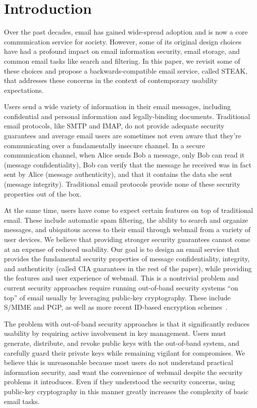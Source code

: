 \section{Introduction}

Over the past decades, email has gained wide-spread adoption 
and is now a core communication service for society. However, 
some of its original design choices have had a profound impact 
on email information security, email storage, and common email 
tasks like search and filtering. In this paper, we revisit some 
of these choices and propose a backwards-compatible email service, 
called STEAK, that addresses these concerns in the context of 
contemporary usability expectations.

Users send a wide variety of information in their email messages, 
including confidential and personal information and legally-binding 
documents. Traditional email protocols, like SMTP and IMAP, do not 
provide adequate security guarantees and average email users are 
sometimes not even aware that they're communicating over a fundamentally 
insecure channel. In a secure communication channel, when Alice sends 
Bob a message, only Bob can read it (message confidentiality), Bob can 
verify that the message he received was in fact sent by Alice (message 
authenticity), and that it contains the data she sent (message integrity). 
Traditional email protocols provide none of these security properties 
out of the box. 

At the same time, users have come to expect certain features on top of 
traditional email.  These include automatic spam filtering, the ability 
to search and organize messages, and ubiquitous access to their email 
through webmail from a variety of user devices. We believe that providing 
stronger security guarantees cannot come at an expense of reduced usability. 
Our goal is to design an email service that provides the fundamental 
security properties of message confidentiality, integrity, and authenticity 
(called CIA guarantees in the rest of the paper), while providing the 
features and user experience of webmail.  This is a nontrivial problem 
and current security approaches require running out-of-band security 
systems ``on top'' of email usually by leveraging public-key cryptography. 
These include S/MIME and PGP, as well as more recent ID-based encryption 
schemes~\cite{id-based-cryptography}.

The problem with out-of-band security approaches is that it significantly 
reduces usability by requiring active involvement in key management. 
Users must generate, distribute, and revoke public keys with the out-of-band 
system, and carefully guard their private keys while remaining vigilant 
for compromises. We believe this is unreasonable because most users do 
not understand practical information security, and want the convenience 
of webmail despite the security problems it introduces. Even if they 
understood the security concerns, using public-key cryptography in this 
manner greatly increases the complexity of basic email tasks. 

